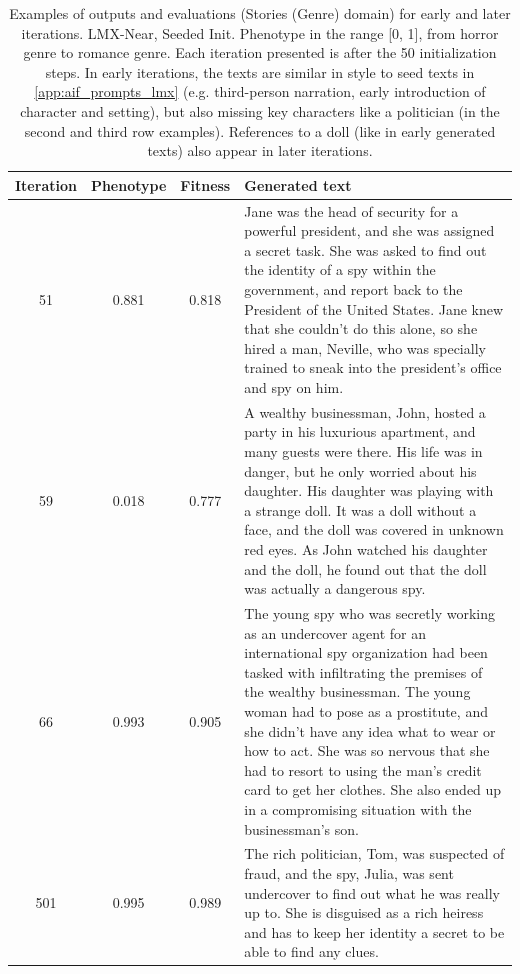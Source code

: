 \begin{table}[ht]
  \caption{Examples of outputs and evaluations (Stories (Genre) domain) for early and later iterations. LMX-Near, Seeded Init. Phenotype in the range [0, 1], from horror genre to romance genre. Each iteration presented is after the 50 initialization steps. In early iterations, the texts are similar in style to seed texts in \ref{app:aif_prompts_lmx} (e.g. third-person narration, early introduction of character and setting), but also missing key characters like a politician (in the second and third row examples). References to a doll (like in early generated texts) also appear in later iterations.}
  \begin{center}
  \small
  \begin{tabular}{cccp{8.5cm}}
    \toprule
    Iteration     & Phenotype  & Fitness     & Generated text \\
    \midrule
    51 &  0.881 & 0.818 & Jane was the head of security for a powerful president, and she was assigned a secret task. She was asked to find out the identity of a spy within the government, and report back to the President of the United States. Jane knew that she couldn't do this alone, so she hired a man, Neville, who was specially trained to sneak into the president’s office and spy on him. \\
    \midrule
    59 & 0.018 & 0.777 & A wealthy businessman, John, hosted a party in his luxurious apartment, and many guests were there. His life was in danger, but he only worried about his daughter. His daughter was playing with a strange doll. It was a doll without a face, and the doll was covered in unknown red eyes. As John watched his daughter and the doll, he found out that the doll was actually a dangerous spy. \\
    \midrule
    66 & 0.993 & 0.905 & The young spy who was secretly working as an undercover agent for an international spy organization had been tasked with infiltrating the premises of the wealthy businessman. The young woman had to pose as a prostitute, and she didn't have any idea what to wear or how to act. She was so nervous that she had to resort to using the man's credit card to get her clothes. She also ended up in a compromising situation with the businessman's son. \\
    \midrule
    \midrule
    501 &  0.995 & 0.989 & The rich politician, Tom, was suspected of fraud, and the spy, Julia, was sent undercover to find out what he was really up to. She is disguised as a rich heiress and has to keep her identity a secret to be able to find any clues. \\

\end{tabular}
\end{center}
\end{table}
